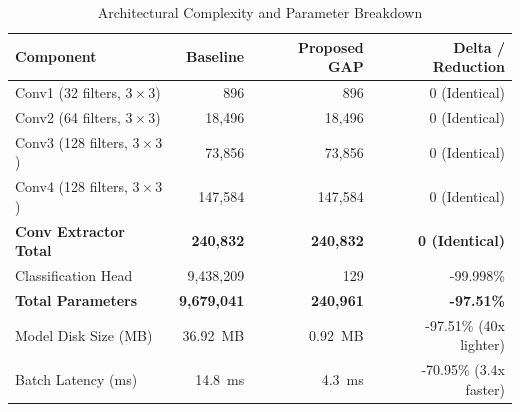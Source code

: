 \documentclass[conference]{IEEEtran}
\begin{document}
\begin{table}[htbp]
\caption{Architectural Complexity and Parameter Breakdown}
\begin{center}
\begin{tabular}{lrrr}
\toprule
\textbf{Component} & \textbf{Baseline \cite{b_stephen}} & \textbf{Proposed GAP} & \textbf{Delta / Reduction} \\
\midrule
Conv1 (32 filters, $3\times3$) & 896 & 896 & 0 (Identical) \\
Conv2 (64 filters, $3\times3$) & 18,496 & 18,496 & 0 (Identical) \\
Conv3 (128 filters, $3\times3$) & 73,856 & 73,856 & 0 (Identical) \\
Conv4 (128 filters, $3\times3$) & 147,584 & 147,584 & 0 (Identical) \\
\textbf{Conv Extractor Total} & \textbf{240,832} & \textbf{240,832} & \textbf{0 (Identical)} \\
\midrule
Classification Head & 9,438,209 & 129 & -99.998\% \\
\textbf{Total Parameters} & \textbf{9,679,041} & \textbf{240,961} & \textbf{-97.51\%} \\
Model Disk Size (MB) & 36.92~MB & 0.92~MB & -97.51\% (40x lighter) \\
Batch Latency (ms) & 14.8~ms & 4.3~ms & -70.95\% (3.4x faster) \\
\bottomrule
\end{tabular}
\label{tab_arch}
\end{center}
\end{table}
\end{document}
